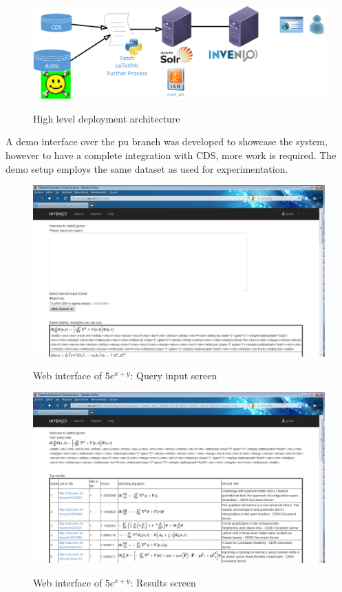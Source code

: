 \begin{figure}
\includegraphics[height=4.2 cm]{visio_drawings/architecture.png}
\label{system_arch}
\caption{High level deployment architecture}
\end{figure}


A demo interface over the {\codefont pu} branch was developed to showcase the system, however to have a complete integration with CDS, more work is required. The demo setup employs the same dataset as used for experimentation. 

\begin{figure}
\includegraphics[height=8 cm]{figures/input_interface.png}
\label{input_int}
\caption{Web interface of $5e^{x+y}$: Query input screen}
\end{figure}

\begin{figure}
\includegraphics[height=8 cm]{figures/results_interface.png}
\label{results_int}
\caption{Web interface of $5e^{x+y}$: Results screen}
\end{figure}
	
 
